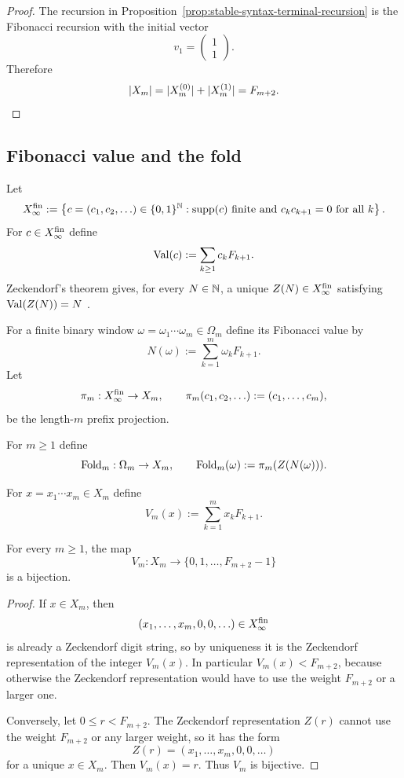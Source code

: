 \begin{proof}
The recursion in Proposition~\ref{prop:stable-syntax-terminal-recursion} is
the Fibonacci recursion with the initial vector
\[
v_1=
\begin{pmatrix}
1\\[2pt]
1
\end{pmatrix}.
\]
Therefore
\[
\lvert X_m\rvert
=
\lvert X_m^{(0)}\rvert+\lvert X_m^{(1)}\rvert
=
F_{m+2}.
\qedhere
\]
\end{proof}

\subsection{Fibonacci value and the fold}

Let
\[
X_\infty^{\mathrm{fin}}
:=
\left\{
c=(c_1,c_2,\ldots)\in\{0,1\}^{\mathbb{N}}:
\operatorname{supp}(c)\text{ finite and }c_kc_{k+1}=0\text{ for all }k
\right\}.
\]
For $c\in X_\infty^{\mathrm{fin}}$ define
\[
\operatorname{Val}(c):=\sum_{k\ge 1} c_kF_{k+1}.
\]
Zeckendorf's theorem gives, for every $N\in\mathbb{N}$, a unique $Z(N)\in X_\infty^{\mathrm{fin}}$
satisfying $\operatorname{Val}(Z(N))=N$ \cite{Zeckendorf1972}.

For a finite binary window $\omega=\omega_1\cdots\omega_m\in\Omega_m$ define
its Fibonacci value by
\[
N(\omega):=\sum_{k=1}^m \omega_kF_{k+1}.
\]
Let
\[
\pi_m:X_\infty^{\mathrm{fin}}\to X_m,
\qquad
\pi_m(c_1,c_2,\ldots):=(c_1,\ldots,c_m),
\]
be the length-$m$ prefix projection.

\begin{definition}
\label{def:fold-word}
For $m\ge 1$ define
\[
\operatorname{Fold}_m:\Omega_m\to X_m,
\qquad
\operatorname{Fold}_m(\omega):=\pi_m(Z(N(\omega))).
\]
\end{definition}

\begin{definition}
\label{def:visible-value}
For $x=x_1\cdots x_m\in X_m$ define
\[
V_m(x):=\sum_{k=1}^m x_kF_{k+1}.
\]
\end{definition}

\begin{proposition}
\label{prop:visible-value-parametrization}
For every $m\ge 1$, the map
\[
V_m:X_m\to \{0,1,\ldots,F_{m+2}-1\}
\]
is a bijection.
\end{proposition}

\begin{proof}
If $x\in X_m$, then
\[
(x_1,\ldots,x_m,0,0,\ldots)\in X_\infty^{\mathrm{fin}}
\]
is already a Zeckendorf digit string, so by uniqueness it is the Zeckendorf
representation of the integer $V_m(x)$.  In particular $V_m(x)<F_{m+2}$,
because otherwise the Zeckendorf representation would have to use the weight
$F_{m+2}$ or a larger one.

Conversely, let $0\le r<F_{m+2}$.  The Zeckendorf representation $Z(r)$ cannot
use the weight $F_{m+2}$ or any larger weight, so it has the form
\[
Z(r)=(x_1,\ldots,x_m,0,0,\ldots)
\]
for a unique $x\in X_m$.  Then $V_m(x)=r$.  Thus $V_m$ is bijective.
\end{proof}

